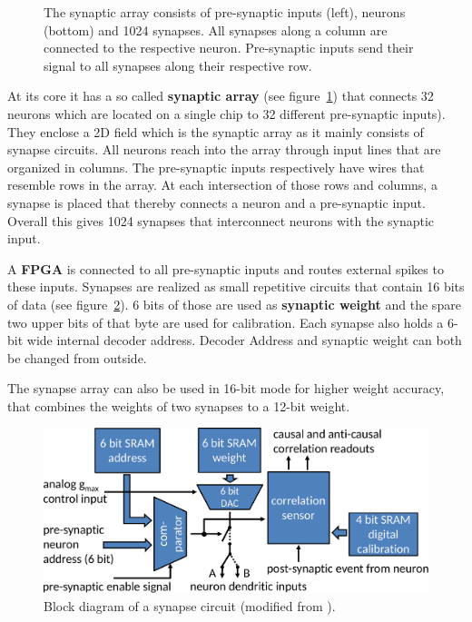\begin{figure}[h!]
    \centering
    \caption{\label{fig:array} The synaptic array consists of pre-synaptic inputs (left), neurons (bottom) and 1024 synapses. All synapses along a column are connected to the respective neuron. Pre-synaptic inputs send their signal to all synapses along their respective row.}
\end{figure}
At its core it has a so called \textbf{synaptic array} (see figure~\ref{fig:array}) that connects 32 neurons which are located on a single chip to 32 different pre-synaptic inputs).
They enclose a 2D field which is the synaptic array as it mainly consists of synapse circuits.
All neurons reach into the array through input lines that are organized in columns.
The pre-synaptic inputs respectively have wires that resemble rows in the array.
At each intersection of those rows and columns, a synapse is placed that thereby connects a neuron and a pre-synaptic input.
Overall this gives 1024 synapses that interconnect neurons with the synaptic input.

A \textbf{\ac{FPGA}} is connected to all pre-synaptic inputs and routes external spikes to these inputs.
Synapses are realized as small repetitive circuits that contain 16 bits of data (see figure~\ref{fig:circuit}).
6 bits of those are used as \textbf{synaptic weight} and the spare two upper bits of that byte are used for calibration.
Each synapse also holds a 6-bit wide internal decoder address.
Decoder Address and synaptic weight can both be changed from outside.

The synapse array can also be used in 16-bit mode for higher weight accuracy, that combines the weights of two synapses to a 12-bit weight.
\begin{figure}[htbp]
    \centering
    \includegraphics[width=\textwidth]{pictures/syncircuit.pdf}
    \caption{\label{fig:circuit} Block diagram of a synapse circuit (modified from \citeauthor{PPU}).}
\end{figure}

